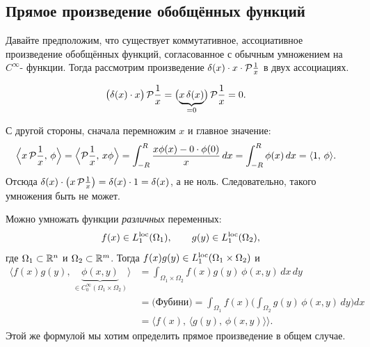 \documentclass[12pt,a4paper]{article}
\begin{document}

\subsection{Прямое произведение обобщённых функций}

Давайте предположим, что существует коммутативное, ассоциативное произведение обобщённых функций, согласованное с обычным умножением на
\(C^\infty\)- функции.
Тогда рассмотрим произведение
\(\delta(x) \cdot x \cdot \mathcal{P}\frac{1}{x}\)
в двух ассоциациях.

\begin{align*}
\bigl(\delta(x) \cdot x\bigr)\, \mathcal{P}\frac{1}{x}
&=
\bigl(\underbrace{x\,\delta(x)}_{=0}\bigr)\,
\mathcal{P}\frac{1}{x}
= 0.
\end{align*}

С другой стороны, сначала перемножим \(x\) и главное значение:
\begin{align*}
\Bigl\langle x\, \mathcal{P}\frac{1}{x},\, \phi \Bigr\rangle
&=
\Bigl\langle \mathcal{P}\frac{1}{x},\, x\phi \Bigr\rangle
=
\int_{-R}^{R}
    \frac{x\phi(x) - 0\cdot\phi(0)}{x}\,dx
=
\int_{-R}^{R} \phi(x)\,dx
=
\langle 1,\, \phi \rangle.
\end{align*}
Отсюда
\(\delta(x) \cdot \bigl(x\, \mathcal{P}\frac{1}{x}\bigr)
= \delta(x) \cdot 1 = \delta(x)\),
а не ноль. Следовательно, такого умножения быть не может.


Можно умножать функции \emph{различных} переменных:
\[
f(x) \in L_1^{\mathrm{loc}}(\Omega_1),
\qquad
g(y) \in L_1^{\mathrm{loc}}(\Omega_2),
\]
где \(\Omega_1 \subset \mathbb{R}^n\) и \(\Omega_2 \subset \mathbb{R}^m\).
Тогда \(f(x)g(y) \in L_1^{\mathrm{loc}}(\Omega_1 \times \Omega_2)\) и
\begin{align*}
\bigl\langle
    f(x)g(y),\,
    \underbrace{\phi(x,y)}_{\in C_0^\infty(\Omega_1\times\Omega_2)}
\bigr\rangle
&=
\int_{\Omega_1\times\Omega_2}
    f(x)g(y)\, \phi(x,y)\, dx\, dy \\
&=
\text{(Фубини)}
=
\int_{\Omega_1}
    f(x)
    \Biggl(
        \int_{\Omega_2} g(y)\, \phi(x,y)\, dy
    \Biggr) dx \\
&=
\bigl\langle
    f(x),\,
    \langle g(y),\, \phi(x,y) \rangle
\bigr\rangle.
\end{align*}
Этой же формулой мы хотим определить прямое произведение
в общем случае.
\end{document}
